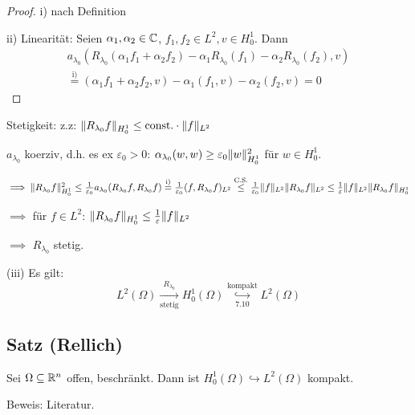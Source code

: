 \begin{proof}
  i) nach Definition

  ii) Linearität: Seien $\alpha_1, \alpha_2 \in \mathbb{C}$, $f_1,f_2 \in L^2, v \in H_0^1$. Dann
  \begin{align*}
  a_{\lambda_0}(R_{\lambda_0}(\alpha_1 f_1 + \alpha_2 f_2) - \alpha_1 R_{\lambda_0}(f_1) - \alpha_2 R_{\lambda_0}(f_2), v) \\
  \overset{\text{i)}}{=} (\alpha_1 f_1 + \alpha_2 f_2, v) - \alpha_1 (f_1, v) - \alpha_2(f_2, v) = 0 
  \end{align*}
\end{proof}

  Stetigkeit: z.z: $\lVert R_{\lambda_0} f \rVert_{H_0^1} \leq \text{const.} \cdot \lVert f \rVert_{L^2}$

  $a_{\lambda_0}$ koerziv, d.h. es ex $\varepsilon_0 > 0$: $\alpha_{\lambda_0}(w,w) \geq \varepsilon_0 \lVert w \rVert_{H_0^1}^2$ für $w \in H_0^1$.

  $\implies \lVert R_{\lambda_0} f \rVert_{H_0^1}^2 \leq \frac{1}{\varepsilon_0} a_{\lambda_0} (R_{\lambda_0} f, R_{\lambda_0} f) \overset{\text{i)}}{=} \frac{1}{\varepsilon_0} (f, R_{\lambda_0}f)_{L^2} 
    \overset{\text{C.S.}}{\leq} \frac{1}{\varepsilon_0} \lVert f \rVert_{L^2} \lVert R_{\lambda_0} f \rVert_{L^2} \leq \frac{1}{\varepsilon} \lVert f \rVert_{L^2} \lVert R_{\lambda_0} f \rVert_{H_0^1}$

  $\implies$ für $f \in L^2$: $\lVert R_{\lambda_0} f \rVert_{H_0^1} \leq \frac{1}{\varepsilon} \lVert f \rVert_{L^2}$

  $\implies$ $R_{\lambda_0}$ stetig.

  (iii) Es gilt: 
  $$
  L^2(\Omega) \underset{\text{stetig}}{\overset{R_{\lambda_0}}{\to}} H_0^1(\Omega) \underset{\text{7.10}}{\overset{\text{kompakt}}{\hookrightarrow}} L^2(\Omega)
  $$

\subsection{Satz (Rellich)}

Sei $\Omega \subseteq \mathbb{R}^n$ offen, beschränkt. Dann ist $H_0^1(\Omega) \hookrightarrow L^2(\Omega)$ kompakt.

Beweis: Literatur.
